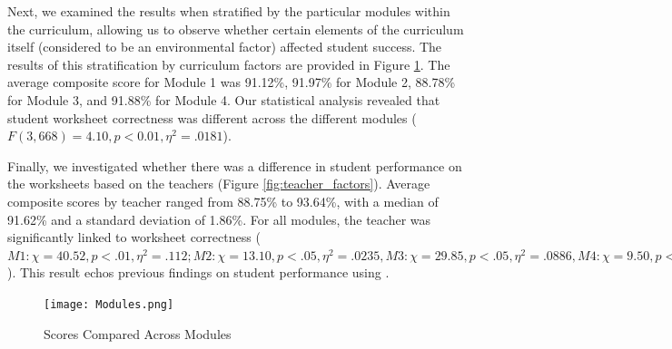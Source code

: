 Next, we examined the results when stratified by the particular modules within the curriculum, allowing us to observe whether certain elements of the curriculum itself (considered to be an environmental factor) affected student success. The results of this stratification by curriculum factors are provided in Figure \ref{fig:curriculum_factors}. The average composite score for Module 1 was 91.12\%, 91.97\% for Module 2, 88.78\% for Module 3, and 91.88\% for Module 4. Our statistical analysis revealed that student worksheet correctness was different across the different modules ($F(3,668)=4.10, p<0.01, \eta^2=.0181$).

Finally, we investigated whether there was a difference in student performance on the worksheets based on the teachers (Figure \ref{fig:teacher_factors}). Average composite scores by teacher ranged from 88.75\% to 93.64\%, with a median of 91.62\% and a standard deviation of 1.86\%. For all modules, the teacher was significantly linked to worksheet correctness ($M1: \chi=40.52, p<.01, \eta^2=.112; M2: \chi=13.10, p<.05, \eta^2=.0235, M3: \chi=29.85, p<.05, \eta^2=.0886, M4: \chi=9.50, p<.01, \eta^2=.0247$). This result echos previous findings on student performance using \ts \cite{franklin2020analysis}.

\begin{figure}
    \centering
    \texttt{[image: Modules.png]}
    \caption{\ts Scores Compared Across Modules}
    \label{fig:curriculum_factors}
\end{figure}

